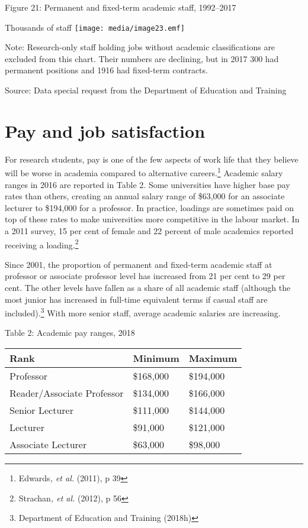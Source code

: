\documentclass[]{book}
\begin{document}
\protect\hypertarget{_Ref520194625}{}{}Figure 21: Permanent and fixed-term academic staff, 1992--2017

Thousands of staff \texttt{[image: media/image23.emf]}

Note: Research-only staff holding jobs without academic classifications are excluded from this chart. Their numbers are declining, but in 2017 300 had permanent positions and 1916 had fixed-term contracts.

Source: Data special request from the Department of Education and Training

\hypertarget{pay-and-job-satisfaction}{%
\section{Pay and job satisfaction}\label{pay-and-job-satisfaction}}

For research students, pay is one of the few aspects of work life that they believe will be worse in academia compared to alternative careers.\footnote{Edwards\emph{, et al.} (2011), p 39} Academic salary ranges in 2016 are reported in Table 2. Some universities have higher base pay rates than others, creating an annual salary range of \$63,000 for an associate lecturer to \$194,000 for a professor. In practice, loadings are sometimes paid on top of these rates to make universities more competitive in the labour market. In a 2011 survey, 15 per cent of female and 22 percent of male academics reported receiving a loading.\footnote{Strachan\emph{, et al.} (2012), p 56}

Since 2001, the proportion of permanent and fixed-term academic staff at professor or associate professor level has increased from 21 per cent to 29 per cent. The other levels have fallen as a share of all academic staff (although the most junior has increased in full-time equivalent terms if casual staff are included).\footnote{Department of Education and Training (2018h)} With more senior staff, average academic salaries are increasing.

\protect\hypertarget{_Ref395885416}{}{}Table 2: Academic pay ranges, 2018

\begin{longtable}[]{@{}lll@{}}
\toprule
\textbf{Rank} & \textbf{Minimum} & \textbf{Maximum}\tabularnewline
\midrule
\endhead
Professor & \$168,000 & \$194,000\tabularnewline
Reader/Associate Professor & \$134,000 & \$166,000\tabularnewline
Senior Lecturer & \$111,000 & \$144,000\tabularnewline
Lecturer & \$91,000 & \$121,000\tabularnewline
Associate Lecturer & \$63,000 & \$98,000\tabularnewline
\bottomrule
\end{longtable}
\end{document}
